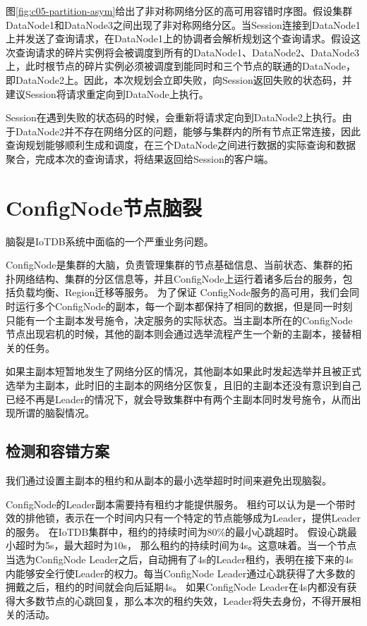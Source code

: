 图\ref{fig:c05-partition-asym}给出了非对称网络分区的高可用容错时序图。假设集群DataNode1和DataNode3之间出现了非对称网络分区。当Session连接到DataNode1上并发送了查询请求，在DataNode1上的协调者会解析规划这个查询请求。假设这次查询请求的碎片实例将会被调度到所有的DataNode1、DataNode2、DataNode3上，此时根节点的碎片实例必须被调度到能同时和三个节点的联通的DataNode，即DataNode2上。因此，本次规划会立即失败，向Session返回失败的状态码，并建议Session将请求重定向到DataNode上执行。

Session在遇到失败的状态码的时候，会重新将请求定向到DataNode2上执行。由于DataNode2并不存在网络分区的问题，能够与集群内的所有节点正常连接，因此查询规划能够顺利生成和调度，在三个DataNode之间进行数据的实际查询和数据聚合，完成本次的查询请求，将结果返回给Session的客户端。

\section{ConfigNode节点脑裂}

脑裂是IoTDB系统中面临的一个严重业务问题。

ConfigNode是集群的大脑，负责管理集群的节点基础信息、当前状态、集群的拓扑网络结构、集群的分区信息等，并且ConfigNode上运行着诸多后台的服务，包括负载均衡、Region迁移等服务。
为了保证
ConfigNode服务的高可用，我们会同时运行多个ConfigNode的副本，每一个副本都保持了相同的数据，但是同一时刻只能有一个主副本发号施令，决定服务的实际状态。当主副本所在的ConfigNode节点出现宕机的时候，其他的副本则会通过选举流程产生一个新的主副本，接替相关的任务。

如果主副本短暂地发生了网络分区的情况，其他副本如果此时发起选举并且被正式选举为主副本，此时旧的主副本的网络分区恢复，且旧的主副本还没有意识到自己已经不再是Leader的情况下，就会导致集群中有两个主副本同时发号施令，从而出现所谓的脑裂情况。

\subsection{检测和容错方案}

我们通过设置主副本的租约和从副本的最小选举超时时间来避免出现脑裂。


ConfigNode的Leader副本需要持有租约才能提供服务。
租约可以认为是一个带时效的排他锁，表示在一个时间内只有一个特定的节点能够成为Leader，提供Leader的服务。
在IoTDB集群中，租约的持续时间为80\%的最小心跳超时。
假设心跳最小超时为5s，最大超时为10s，
那么租约的持续时间为4s。这意味着。当一个节点当选为ConfigNode Leader之后，自动拥有了4s的Leader租约，表明在接下来的4s内能够安全行使Leader的权力。每当ConfigNode Leader通过心跳获得了大多数的拥戴之后，租约的时间就会向后延期4s。
如果ConfigNode Leader在4s内都没有获得大多数节点的心跳回复，那么本次的租约失效，Leader将失去身份，不得开展相关的活动。

